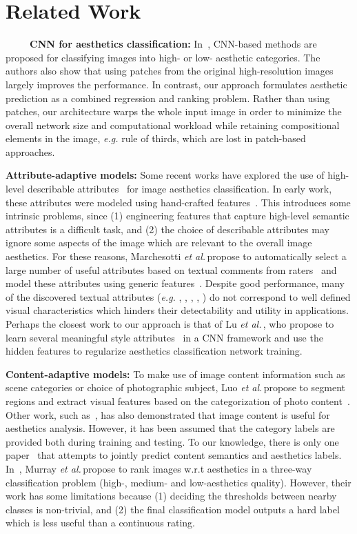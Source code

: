 \documentclass[runningheads]{llncs}
\def\eg{\emph{e.g. }}
\def\etal{{\em et al.\/}\,}
\begin{document}
\section{Related Work}
\label{sec:relatedWork}

\ \ \ \ \  \textbf{CNN for aesthetics classification: }
In~\cite{lu2014rapid,kang2014convolutional,xin2015iccv},
CNN-based methods are proposed for classifying images into high- or low- aesthetic categories.
The authors also show that using patches from the original high-resolution images largely improves the performance.
In contrast,
our approach formulates aesthetic prediction as a combined regression and ranking problem.
Rather than using patches, our architecture warps the whole input image in order to minimize
the overall network size and computational workload while retaining compositional elements in the image,
\eg rule of thirds, which are lost in patch-based approaches.

\textbf{Attribute-adaptive models: }
Some recent works have explored the use of high-level describable
attributes~\cite{dhar2011high,marchesotti2014discovering,lu2014rapid} for image
aesthetics classification.
In early work, these attributes were modeled using hand-crafted features~\cite{dhar2011high}.
This introduces some intrinsic problems, since
(1) engineering features that capture high-level semantic attributes is a difficult task,
and (2) the choice of describable attributes may ignore some aspects of the image which
are relevant to the overall image aesthetics.
For these reasons,
Marchesotti \etal propose to automatically select a large number of useful attributes based on textual comments from raters~\cite{marchesotti2013learning}
and model these attributes using generic features~\cite{marchesotti2011assessing}.
Despite good performance,
many of the discovered textual attributes (\eg , ,
, , ) do not correspond to well defined visual characteristics which hinders their
detectability and utility in applications.
Perhaps the closest work to our approach is that of Lu \etal, who propose to
learn several meaningful style attributes~\cite{lu2014rapid} in a CNN
framework and use the hidden features to regularize aesthetics classification network training.

\textbf{Content-adaptive models: }
To make use of image content information such as scene categories or choice of
photographic subject, Luo \etal propose to segment regions and extract visual
features based on the categorization of photo content~\cite{luo2011content}.
Other work, such as~\cite{murray2012ava,xin2015TMM}, has also demonstrated that
image content is useful for aesthetics analysis. However, it has been assumed
that the category labels are provided both during  training and testing.
To our knowledge,
there is only one paper~\cite{murray2012learning} that attempts to jointly predict content semantics and aesthetics labels.
In~\cite{murray2012learning},
Murray \etal propose to rank images w.r.t aesthetics in a three-way classification problem (high-, medium- and low-aesthetics quality).
However,
their work has some limitations because (1) deciding the thresholds between nearby classes is non-trivial,
and (2) the final classification model outputs a hard label which is less useful than a continuous rating.
\end{document}
